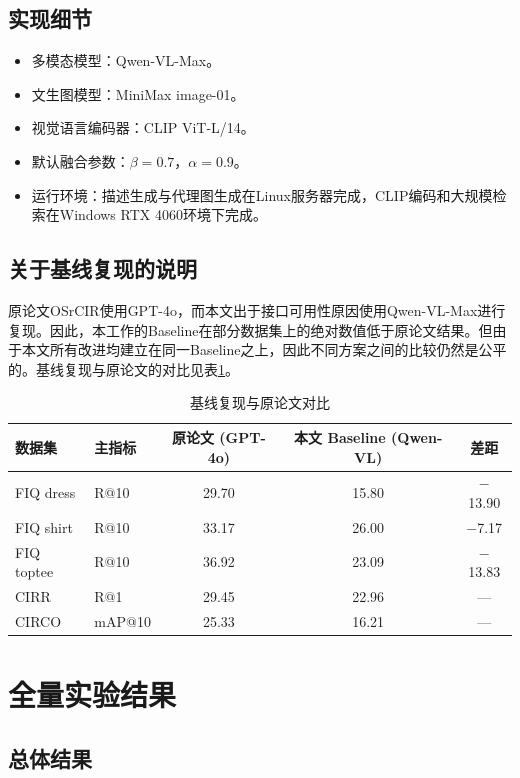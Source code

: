 \documentclass[12pt,a4paper,UTF8,oneside,openany]{ctexrep}
\begin{document}
\subsection{实现细节}

\begin{itemize}[leftmargin=2\ccwd]
  \item 多模态模型：Qwen-VL-Max。
  \item 文生图模型：MiniMax image-01。
  \item 视觉语言编码器：CLIP ViT-L/14。
  \item 默认融合参数：$\beta=0.7$，$\alpha=0.9$。
  \item 运行环境：描述生成与代理图生成在Linux服务器完成，CLIP编码和大规模检索在Windows RTX 4060环境下完成。
\end{itemize}

\subsection{关于基线复现的说明}

原论文OSrCIR使用GPT-4o，而本文出于接口可用性原因使用Qwen-VL-Max进行复现。因此，本工作的Baseline在部分数据集上的绝对数值低于原论文结果。但由于本文所有改进均建立在同一Baseline之上，因此不同方案之间的比较仍然是公平的。基线复现与原论文的对比见表\ref{tab:baseline_compare}。

\begin{table}[htbp]
\centering
\caption{基线复现与原论文对比}
\label{tab:baseline_compare}
\small
\begin{tabular}{llccc}
\toprule
数据集 & 主指标 & 原论文 (GPT-4o) & 本文 Baseline (Qwen-VL) & 差距 \\
\midrule
FIQ dress  & R@10   & 29.70 & 15.80 & $-$13.90 \\
FIQ shirt  & R@10   & 33.17 & 26.00 & $-$7.17 \\
FIQ toptee & R@10   & 36.92 & 23.09 & $-$13.83 \\
CIRR       & R@1    & 29.45 & 22.96 & — \\
CIRCO      & mAP@10 & 25.33 & 16.21 & — \\
\bottomrule
\end{tabular}
\end{table}


\section{全量实验结果}

\subsection{总体结果}
\end{document}
